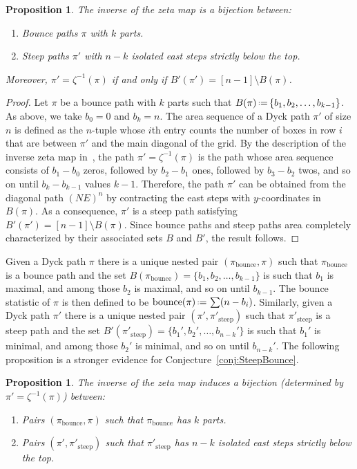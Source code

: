 \documentclass{amsart}
\newtheorem{proposition}[theorem]{Proposition}
\theoremstyle{definition}
\newcommand{\eqdef}{\mbox{\,\raisebox{0.2ex}{\scriptsize\ensuremath{\mathrm:}}\ensuremath{=}\,}} %
\newcommand{\bounce}{\operatorname{bounce}} %
\newcommand{\steep}{\operatorname{steep}} %
\begin{document}
\begin{proposition}
\label{prop:bijectionBounceSteep}
The inverse of the zeta map is a bijection between:
\begin{enumerate}
\item Bounce paths $\pi$ with $k$ parts.
\item Steep paths $\pi'$ with $n-k$ isolated east steps strictly below the top.
\end{enumerate}
Moreover, $\pi'=\zeta^{-1}(\pi)$ if and only if $B'(\pi')=[n-1]\setminus B(\pi)$.
\end{proposition}

\begin{proof}
Let $\pi$ be a bounce path with $k$ parts such that $B(\pi) \eqdef \{b_1,b_2,\dots,b_{k-1}\}$. As above, we take $b_0=0$ and $b_k=n$. 
The area sequence of a Dyck path $\pi'$ of size $n$ is defined as the $n$-tuple whose $i$th entry counts the number of boxes in row $i$ that are between $\pi'$ and the main diagonal of the grid.
By the description of the inverse zeta map in~\cite[Proof of Theorem~3.15]{Haglund-qt-catalan}, the path $\pi'=\zeta^{-1}(\pi)$ is the path whose area sequence consists of $b_1-b_0$ zeros, followed by $b_2-b_1$ ones, followed by $b_3-b_2$ twos, and so on until $b_k-b_{k-1}$ values $k-1$. 
Therefore, the path $\pi'$ can be obtained from the diagonal path $(NE)^n$ by contracting the east steps with $y$-coordinates in $B(\pi)$. 
As a consequence, $\pi'$ is a steep path satisfying $B'(\pi')= [n-1]\setminus B(\pi)$. Since bounce paths and steep paths area completely characterized by their associated sets $B$ and $B'$, the result follows. 
\end{proof}

Given a Dyck path $\pi$ there is a unique nested pair $(\pi_{\bounce},\pi)$ such that $\pi_{\bounce}$ is a bounce path and 
the set $B(\pi_{\bounce}) = \{b_1,b_2,\dots,b_{k-1}\}$ is such that $b_1$ is maximal, and among those $b_2$ is maximal, and so
on until $b_{k-1}$. The bounce statistic of $\pi$ is then defined to be ${\bounce(\pi) \eqdef \sum(n-b_i)}$.
Similarly, given a Dyck path $\pi'$ there is a unique nested pair  $(\pi',\pi'_{\steep})$ such that 
$\pi'_{\steep}$ is a steep path and the set $B'(\pi'_{\steep})=\{b_1',b_2',\dots,b_{n-k}'\}$ 
is such that $b_1'$ is minimal, and among those $b_2'$ is minimal, and so on until $b_{n-k}'$.
The following proposition is a stronger evidence for Conjecture~\ref{conj:SteepBounce}.

\begin{proposition}
The inverse of the zeta map induces a bijection (determined by $\pi'=\zeta^{-1}(\pi)$) between:
\begin{enumerate}
\item Pairs $(\pi_{\bounce},\pi)$ such that $\pi_{\bounce}$ has $k$ parts.
\item Pairs $(\pi',\pi'_{\steep})$ such that $\pi'_{\steep}$ has $n-k$ isolated east steps strictly below the top.
\end{enumerate}
\end{proposition}
\end{document}
